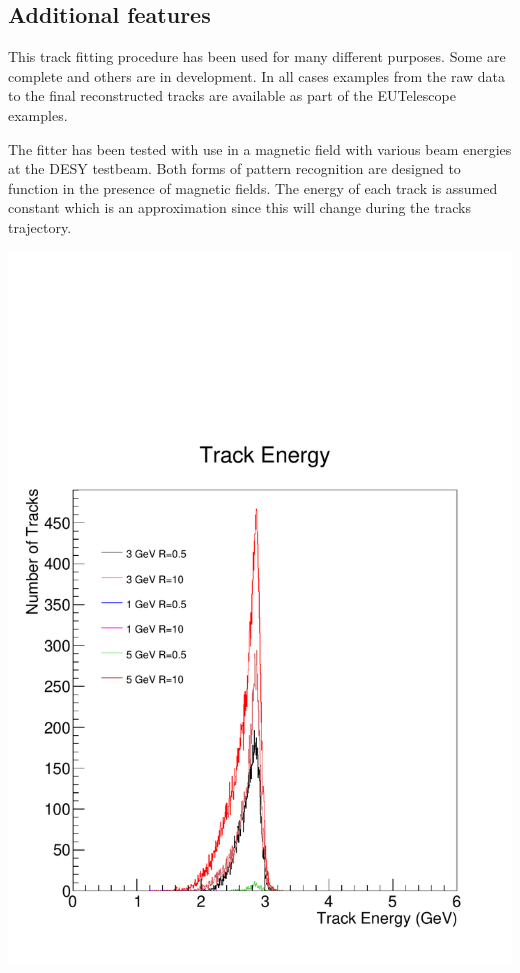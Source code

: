 \documentclass[a0,portrait]{a0poster}
\begin{document}
\begin{multicols}{2}
\section*{Additional features}
This track fitting procedure has been used for many different purposes. Some are complete and others are in development. In all cases examples from the raw data to the final reconstructed tracks are available as part of the EUTelescope examples. 

The fitter has been tested with use in a magnetic field with various beam energies at the DESY testbeam. Both forms of pattern recognition are designed to function in the presence of magnetic fields. The energy of each track is assumed constant which is an approximation since this will change during the tracks trajectory.
\begin{center}
\includegraphics[width=0.8\linewidth]{figures/beamE3B1.pdf}
\label{trine}
\end{center}


\end{multicols}
\end{document}
